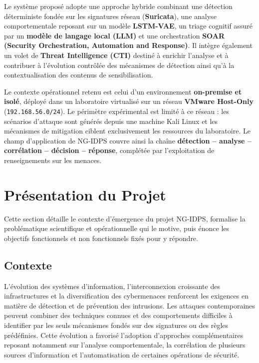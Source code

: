 Le système proposé adopte une approche hybride combinant une détection déterministe fondée sur les signatures réseau (\textbf{Suricata}), une analyse comportementale reposant sur un modèle \textbf{LSTM-VAE}, un triage cognitif assuré par un \textbf{modèle de langage local (LLM)} et une orchestration \textbf{SOAR (Security Orchestration, Automation and Response)}. Il intègre également un volet de \textbf{Threat Intelligence (CTI)} destiné à enrichir l'analyse et à contribuer à l'évolution contrôlée des mécanismes de détection ainsi qu'à la contextualisation des contenus de sensibilisation.

Le contexte opérationnel retenu est celui d'un environnement \textbf{on-premise et isolé}, déployé dans un laboratoire virtualisé sur un réseau \textbf{VMware Host-Only} (\texttt{192.168.56.0/24}). Le périmètre expérimental est limité à ce réseau : les scénarios d'attaque sont générés depuis une machine Kali Linux et les mécanismes de mitigation ciblent exclusivement les ressources du laboratoire. Le champ d'application de NG-IDPS couvre ainsi la chaîne \textbf{détection -- analyse -- corrélation -- décision -- réponse}, complétée par l'exploitation de renseignements sur les menaces.

\section{Présentation du Projet}

Cette section détaille le contexte d'émergence du projet NG-IDPS, formalise la problématique scientifique et opérationnelle qui le motive, puis énonce les objectifs fonctionnels et non fonctionnels fixés pour y répondre.

\subsection{Contexte}

L'évolution des systèmes d'information, l'interconnexion croissante des infrastructures et la diversification des cybermenaces renforcent les exigences en matière de détection et de prévention des intrusions. Les attaques contemporaines peuvent combiner des techniques connues et des comportements difficiles à identifier par les seuls mécanismes fondés sur des signatures ou des règles prédéfinies. Cette évolution a favorisé l'adoption d'approches complémentaires reposant notamment sur l'analyse comportementale, la corrélation de plusieurs sources d'information et l'automatisation de certaines opérations de sécurité.

